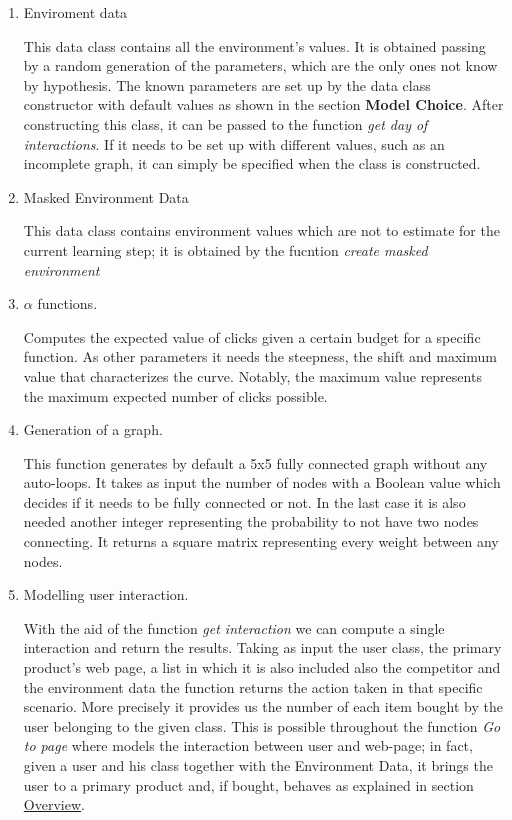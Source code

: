  \begin{enumerate}
     \item Enviroment data
     
     This data class contains all the environment's values. It is obtained passing by a random generation of the parameters, which are the only ones not know by hypothesis. The known parameters are set up by the data class constructor with default values as shown in the section \textbf{Model Choice}. After constructing this class, it can be passed to the function  \textit{get day of interactions}. If it needs to be set up with different values, such as an incomplete graph, it can simply be specified when the class is constructed.
     
     \item  Masked Environment Data
     
     This data class contains environment values which are not to estimate for the current learning step; it is obtained by the fucntion \textit{create masked environment} 
    
     \item $\alpha$ functions.
     
     Computes the expected value of clicks given a certain budget for a specific function. As other parameters it needs the steepness, the shift and maximum value that characterizes the curve. Notably, the maximum value represents the maximum expected number of clicks possible.
  
    \item Generation of a graph.
    
    This function generates by default a 5x5 fully connected graph without any auto-loops. It takes as input the number of nodes with a Boolean value which decides if it needs to be fully connected or not. In the last case it is also needed another integer representing the probability to not have two nodes connecting. It returns a square matrix representing every weight between any nodes.
   
    \item Modelling user interaction.
    
    With the aid of the function \textit{get interaction} we can compute a single interaction and return the results. Taking as input the user class, the primary product's web page, a list in which it is also included also the competitor and the environment data the function returns the action taken in that specific scenario. More precisely it provides us the number of each item bought by the user belonging to the given class.
    This is possible throughout the function \textit{Go to page} where models the interaction between user and web-page; in fact, given a user and his class together with the Environment Data, it brings the user to a primary product and, if bought, behaves as explained in section \hyperref[sec:intro_overview]{Overview}.
    

\end{enumerate}
